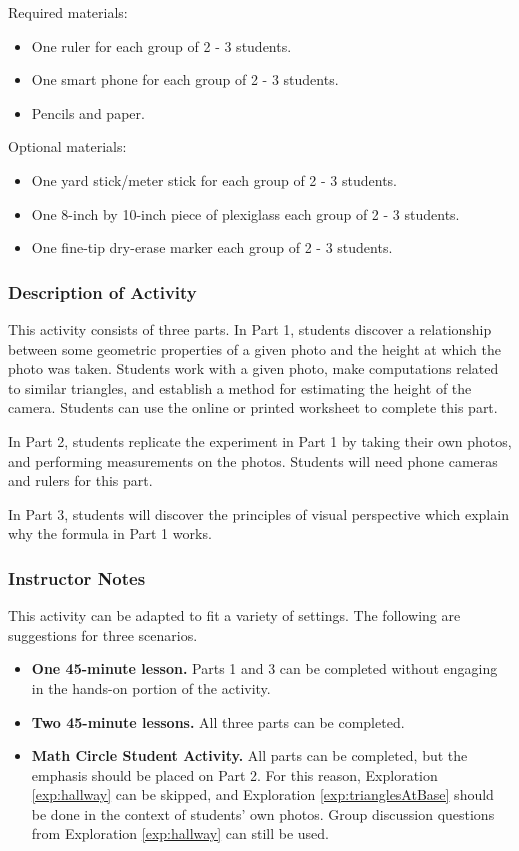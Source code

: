 \documentclass{ximera}
\begin{document}
Required materials: 
\begin{itemize}
    \item One ruler for each group of 2 - 3 students.
    \item One smart phone for each group of 2 - 3 students.
    \item Pencils and paper. 
\end{itemize}

Optional materials:
\begin{itemize}
    \item One yard stick/meter stick for each group of 2 - 3 students.
    \item One 8-inch by 10-inch piece of plexiglass each group of 2 - 3 students.
    \item One fine-tip dry-erase marker each group of 2 - 3 students.
\end{itemize}

\subsubsection*{Description of Activity}
This activity consists of three parts.  In Part 1, students discover a relationship between some geometric properties of a given photo and the height at which the photo was taken.  Students work with a given photo, make computations related to similar triangles, and establish a method for estimating the height of the camera.  Students can use the online or printed worksheet to complete this part.  

In Part 2, students replicate the experiment in Part 1 by taking their own photos, and performing measurements on the photos.  Students will need phone cameras and rulers for this part.

In Part 3, students will discover the principles of visual perspective which explain why the formula in Part 1 works.

\subsubsection*{Instructor Notes}

This activity can be adapted to fit a variety of settings.  The following are suggestions for three scenarios.

\begin{itemize}
    \item \textbf{One 45-minute lesson.} Parts 1 and 3 can be completed without engaging in the hands-on portion of the activity.  
    \item \textbf{Two 45-minute lessons.} All three parts can be completed.
    \item \textbf{Math Circle Student Activity.}  All parts can be completed, but the emphasis should be placed on Part 2.  For this reason, Exploration \ref{exp:hallway} can be skipped, and Exploration \ref{exp:trianglesAtBase} should be done in the context of students' own photos.  Group discussion questions from Exploration \ref{exp:hallway} can still be used.
\end{itemize}
\end{document}
